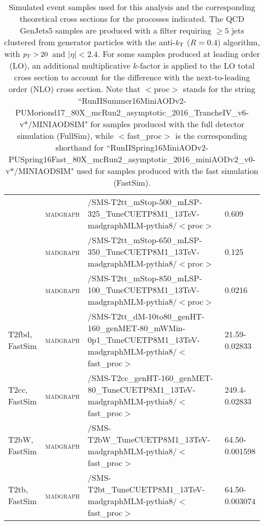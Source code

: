 \begin{table}[!htp]
\begin{center}
{\begin{tabular}{|l|l|l|l|}
     & \textsc{madgraph} & /SMS-T2tt\_mStop-500\_mLSP-325\_TuneCUETP8M1\_13TeV-madgraphMLM-pythia8/$<$proc$>$ & 0.609 \\
     & \textsc{madgraph} & /SMS-T2tt\_mStop-650\_mLSP-350\_TuneCUETP8M1\_13TeV-madgraphMLM-pythia8/$<$proc$>$ & 0.125 \\
     & \textsc{madgraph} & /SMS-T2tt\_mStop-850\_mLSP-100\_TuneCUETP8M1\_13TeV-madgraphMLM-pythia8/$<$proc$>$ & 0.0216 \\
\hline
T2fbd, FastSim & \textsc{madgraph} & /SMS-T2tt\_dM-10to80\_genHT-160\_genMET-80\_mWMin-0p1\_TuneCUETP8M1\_13TeV-madgraphMLM-pythia8/$<$fast\_proc$>$ & 21.59-0.02833 \\
T2cc, FastSim & \textsc{madgraph} & /SMS-T2cc\_genHT-160\_genMET-80\_TuneCUETP8M1\_13TeV-madgraphMLM-pythia8/$<$fast\_proc$>$ & 249.4-0.02833 \\
T2bW, FastSim & \textsc{madgraph} & /SMS-T2bW\_TuneCUETP8M1\_13TeV-madgraphMLM-pythia8/$<$fast\_proc$>$ & 64.50-0.001598 \\
T2tb, FastSim & \textsc{madgraph} & /SMS-T2bt\_TuneCUETP8M1\_13TeV-madgraphMLM-pythia8/$<$fast\_proc$>$ & 64.50-0.003074 \\
\hline
\end{tabular}
}
\end{center}
\caption{\label{tab:signals}Simulated event samples used for this analysis and the corresponding theoretical cross sections for the processes indicated. The QCD GenJets5 samples are produced with a filter requiring $\geq 5$ jets clustered from generator particles with the anti-$k_{\rm T}$ ($R=0.4$) algorithm, with $p_{T} > 20$~\GeV and $|\eta| < 2.4$. For some samples produced at leading order (LO), an additional multiplicative $k$-factor is applied to the LO total cross section to account for the difference with the next-to-leading order (NLO) cross section. Note that $<$proc$>$ stands for the string ``RunIISummer16MiniAODv2-PUMoriond17\_80X\_mcRun2\_asymptotic\_2016\_TrancheIV\_v6-v*/MINIAODSIM" for samples produced with the full detector simulation (FullSim), while $<$fast\_proc$>$ is the corresponding shorthand for ``RunIISpring16MiniAODv2-PUSpring16Fast\_80X\_mcRun2\_asymptotic\_2016\_miniAODv2\_v0-v*/MINIAODSIM" used for samples produced with the fast simulation (FastSim).}
\end{table}
